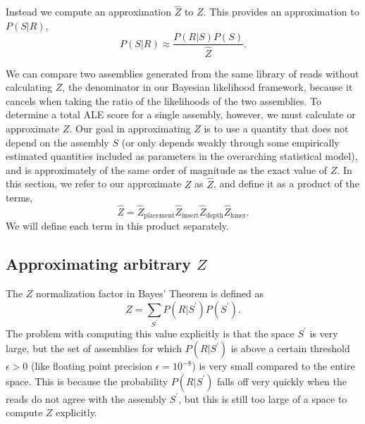\documentclass[phd,tocprelim]{cornell}
\begin{document}
Instead we compute an approximation $\hat{Z}$ to $Z$.  This provides an approximation to $P(S|R)$,
\begin{equation}
    P(S|R) \approx \frac{P(R|S)P(S)}{\hat{Z}}.
\end{equation}

We can compare two assemblies generated from the same library of reads without calculating $Z$, the denominator in our Bayesian likelihood framework, because it cancels when taking the ratio of the likelihoods of the two assemblies. To determine a total ALE score for a single assembly, however, we must calculate or approximate $Z$. Our goal in approximating $Z$ is to use a quantity that does not depend on the assembly $S$ (or only depends weakly through some empirically estimated quantities included as parameters in the overarching statistical model), and is approximately of the same order of magnitude as the exact value of $Z$.  In this section, we refer to our approximate $Z$ as $\hat{Z}$, and define it as a product of the terms,
\begin{equation}
    \hat{Z} = \hat{Z}_{\text{placement}}\hat{Z}_{\text{insert}}\hat{Z}_{\text{depth}}\hat{Z}_{\text{kmer}}.
\end{equation}
We will define each term in this product separately.

\subsection{Approximating arbitrary $Z$}
\label{arbZ}

The $Z$ normalization factor in Bayes' Theorem is defined as
\begin{equation}
    Z = \sum_{S^{\prime}}P(R|S^{\prime})P(S^{\prime}).
\end{equation}
The problem with computing this value explicitly is that the space $S^{\prime}$ is very large, but the set of assemblies for which $P(R|S^{\prime})$ is above a certain threshold $\epsilon > 0$ (like floating point precision $\epsilon = 10^{-8}$) is very small compared to the entire space. This is because the probability $P(R|S^{\prime})$ falls off very quickly when the reads do not agree with the assembly $S^{\prime}$, but this is still too large of a space to compute $Z$ explicitly.
\end{document}

